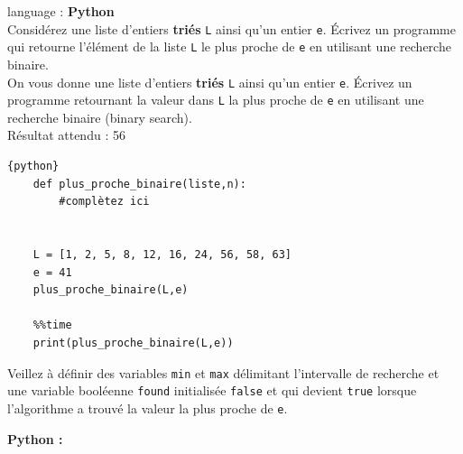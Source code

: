 \begin{Exercice}[15 minutes] language : \textbf{Python}\\

Considérez une liste d’entiers \textbf{triés} \lstinline{L} ainsi qu’un entier \lstinline{e}. Écrivez un programme qui retourne l'élément de la liste \lstinline{L} le plus proche de \lstinline{e} en utilisant une recherche binaire.\\

On vous donne une liste d’entiers \textbf{triés} \lstinline{L} ainsi qu’un entier \lstinline{e}. Écrivez un programme retournant la valeur dans \lstinline{L} la plus proche de \lstinline{e} en utilisant une recherche binaire (binary search).\\

Résultat attendu : 56\\

    \begin{lstlisting}{python}
    def plus_proche_binaire(liste,n):
        #complètez ici
        
        
    L = [1, 2, 5, 8, 12, 16, 24, 56, 58, 63]  
    e = 41
    plus_proche_binaire(L,e)
    
    %%time
    print(plus_proche_binaire(L,e))
    \end{lstlisting}

\begin{conseil}
    Veillez à définir des variables \lstinline{min} et \lstinline{max} délimitant l'intervalle de recherche et une variable booléenne \lstinline{found} initialisée \lstinline{false} et qui devient \lstinline{true} lorsque l'algorithme a trouvé la valeur la plus proche de \lstinline{e}. 
    
\end{conseil}

    \begin{solution}
        \textbf{Python :}
        
    \end{solution}

\end{Exercice}

